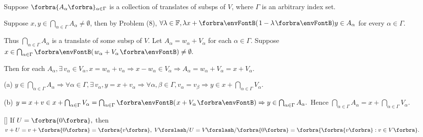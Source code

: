 \par\quad
Suppose $\Bra{A_{\alpha}}{_{\alpha\in\Gamma}}$ is a collection of translates of subsps of $V$, where $\Gamma$ is an arbitrary index set.\vspace{8pt}\par\quad
Suppose $x,y\in\bigcap_{\alpha\in\Gamma}A_{\alpha}\neq\emptyset$, then by Problem (8), $\forall\lambda\in\Fbb,\lambda x+\Par{1-\lambda}y\in A_{\alpha}$ for every $\alpha\in\Gamma$.\par\quad
Thus $\bigcap_{\alpha\in\Gamma}A_\alpha$ is a translate of some subsp of $V$.\PfEnd\vspace{6pt}\quad
\Or Let $A_\alpha=w_\alpha+V_\alpha$ for each $\alpha\in\Gamma$. Suppose $x\in\bigcap_{\alpha\in\Gamma}\Par{w_\alpha+V_\alpha}\neq\emptyset.$\par\quad
Then for each $A_\alpha,\exists\,v_\alpha\in V_\alpha,x=w_\alpha+v_\alpha\Rightarrow x-w_\alpha\in V_\alpha\Rightarrow A_\alpha=w_\alpha+V_\alpha=x+V_\alpha.$\vspace{3pt}\par\quad
(a) $y\in\bigcap_{\alpha\in\Gamma}A_\alpha\Rightarrow\forall\alpha\in\Gamma,\exists\,v_\alpha,y=x+v_\alpha\Rightarrow\forall\alpha,\beta\in\Gamma,v_\alpha=v_\beta\Rightarrow y\in x+\bigcap_{\alpha\in\Gamma}V_\alpha.$\vspace{3pt}\par\quad
(b) $y=x+v\in x+\bigcap_{\alpha\in\Gamma}V_\alpha=\bigcap_{\alpha\in\Gamma}\Par{x+V_\alpha}\Rightarrow y\in\bigcap_{\alpha\in\Gamma}A_\alpha.$ Hence $\bigcap_{\alpha\in\Gamma}A_\alpha=x+\bigcap_{\alpha\in\Gamma}V_\alpha.$\PfEnd
\SepLine

\ProblemBnoor[]{\NoteForSmall{[3.79, 3.83]}}[]{
	{If $U=\zeroSubs,$ then $v+U=v+\zeroSubs=\Bra{v},\;V\mySlash U=V\mySlash\zeroSubs=\Bra{\Bra{v}:v\in V}.$}\TextB{\vspace{-3pt}}
}\SepLine\pagebreak

